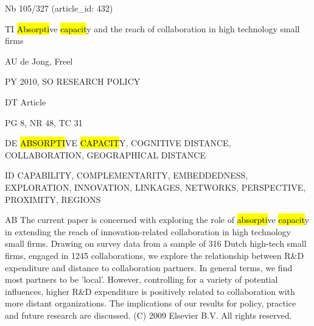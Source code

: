 \documentclass[a4paper]{article}
\begin{document}
\vspace*{-2cm}
Nb \tabto{0cm}105/327 (article\_id: 432)\par
TI \tabto{0cm}\hl{Absorpti}ve \hl{capacit}y and the reach of collaboration in high technology small firms\par
AU \tabto{0cm}de Jong, Freel\par
PY \tabto{0cm}2010, SO RESEARCH POLICY\par
DT \tabto{0cm}Article\par
PG \tabto{0cm}8, NR 48, TC 31\par
DE \tabto{0cm}\hl{ABSORPTI}VE \hl{CAPACIT}Y, COGNITIVE DISTANCE, COLLABORATION, GEOGRAPHICAL DISTANCE\par
ID \tabto{0cm}CAPABILITY, COMPLEMENTARITY, EMBEDDEDNESS, EXPLORATION, INNOVATION, LINKAGES, NETWORKS, PERSPECTIVE, PROXIMITY, REGIONS\par
AB \tabto{0cm}The current paper is concerned with exploring the role of \hl{absorpti}ve \hl{capacit}y in extending the reach of innovation-related collaboration in high technology small firms. Drawing on survey data from a sample of 316 Dutch high-tech small firms, engaged in 1245 collaborations, we explore the relationship between R\&D expenditure and distance to collaboration partners. In general terms, we find most partners to be 'local'. However, controlling for a variety of potential influences, higher R\&D expenditure is positively related to collaboration with more distant organizations. The implications of our results for policy, practice and future research are discussed. (C) 2009 Elsevier B.V. All rights reserved.\par
\clearpage
\end{document}
